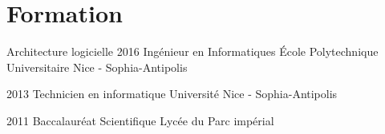 \section{Formation}

\begin{yearlist}

\item[Architecture logicielle]{2016}
     {Ing\'enieur en Informatiques}
     {\'Ecole Polytechnique Universitaire Nice - Sophia-Antipolis}

\item{2013}
     {Technicien en informatique}
     {Universit\'e Nice - Sophia-Antipolis}

\item{2011}
     {Baccalaur\'eat Scientifique}
     {Lyc\'ee du Parc imp\'erial}

\end{yearlist}